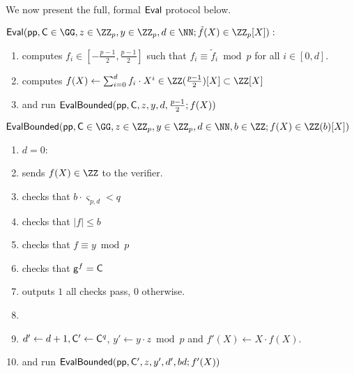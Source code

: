 We now present the full, formal $\textsf{{Eval}}$ protocol below.
\begin{mdframed}
\begin{minipage}{\textwidth}
			$\pro{Eval}(\crs, \gr{C}\in \GG, z\in \ZZ_p, y\in \ZZ_p, d \in \NN; \tilde{f}(X)\in \ZZ_p[X]) :$ 
			\begin{enumerate}[nolistsep]
			\item \prover computes $f_i \in [-\frac{p-1}{2},\frac{p-1}{2}]$ such that $f_i\equiv \tilde{f}_i\bmod p$ for all $i\in[0,d]$.
			\item \prover computes $f(X)\gets \sum_{i=0}^d f_i \cdot X^{i}\in \ZZ(\frac{p-1}{2})[X]\subset \ZZ[X]$
			\item \prover and \verifier run $\textsf{{EvalBounded}}(\textsf{pp},\mathsf{C},z,y,d,\frac{p-1}{2};f(X))$
		    \end{enumerate}
		    		\vspace{1em}
		$\pro{EvalBounded}(\crs,\gr{C}\in \GG,z\in \ZZ_p,y\in \ZZ_p,d\in \NN,b\in \ZZ;f(X)\in \ZZ(b)[X])$		
	    \begin{enumerate}[nolistsep]
        \item \pcif $d=0$:
        \item \label{line:basestart}\pcind[1] \prover sends $f(X)\in \ZZ$ to the verifier. 

        \item \pcind[1] \verifier checks that $b\cdot \boldsymbol{\varsigma}_{p,d} < q$
        \item \pcind[1] \verifier checks that $|f|\leq b$
          \item \pcind[1] \verifier checks that $f\equiv y \bmod p$
                \item \label{line:baseend}\pcind[1] \verifier checks that $\mathsf{g}^{f}=\mathsf{C}$
\item \pcind[1] \verifier outputs $1$ \pcif all checks pass, $0$ otherwise.
          \item {}
         \item \pcind[1]  $d'\gets d+1, \mathsf{C}'\gets \mathsf{C}^q$, $y'\gets y\cdot z \bmod p$ and $f'(X)\gets X \cdot f(X)$.
         \item \pcind[1] \prover and \verifier run $\textsf{{EvalBounded}}(\textsf{pp},\mathsf{C}',z,y',d',bd;f'(X))$


\end{enumerate}
\end{minipage}
\end{mdframed}
